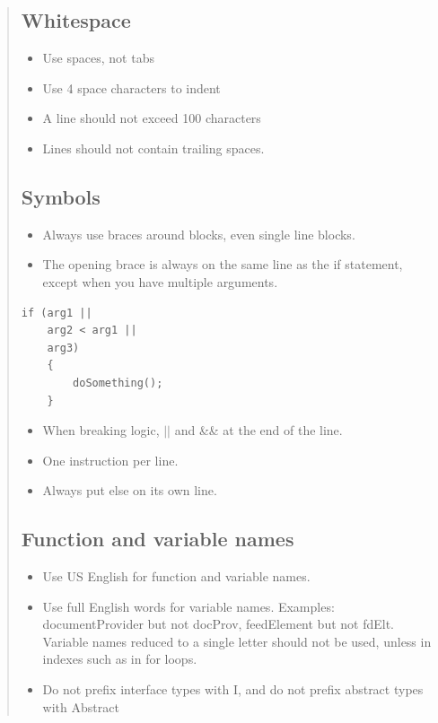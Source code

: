 \documentclass[11pt]{book}
\begin{document}
\begin{quotation}\noindent
\subsection{Whitespace}
\begin{itemize}
    \item Use spaces, not tabs
    \item Use 4 space characters to indent
    \item A line should not exceed 100 characters
    \item Lines should not contain trailing spaces.
\end{itemize}

\subsection{Symbols}
\begin{itemize}
    \item Always use braces around blocks, even single line blocks.
    \item The opening brace is always on the same line as the if statement, except when you have multiple arguments.
\end{itemize}
\lstset{language=Java}
\begin{lstlisting}[frame=single]
if (arg1 ||
    arg2 < arg1 ||
    arg3)
    {
        doSomething();
    }
\end{lstlisting}
\begin{itemize}
    \item When breaking logic, $||$ and \&\& at the end of the line.
    \item One instruction per line.
    \item Always put else on its own line.
\end{itemize}

\subsection{Function and variable names}
\begin{itemize}
    \item Use US English for function and variable names.
    \item Use full English words for variable names. Examples: documentProvider but not docProv, feedElement but not fdElt. Variable names reduced to a single letter should not be used, unless in indexes such as in for loops.
    \item Do not prefix interface types with I, and do not prefix abstract types with Abstract
\end{itemize}


\end{quotation}
\end{document}
